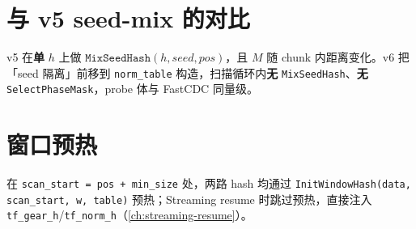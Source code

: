 \section{与 v5 seed-mix 的对比}

v5 在\textbf{单} $h$ 上做 $\texttt{MixSeedHash}(h, seed, pos)$，且 $M$ 随 chunk 内距离变化。v6 把「seed 隔离」前移到 \texttt{norm\_table} 构造，扫描循环内\textbf{无} \texttt{MixSeedHash}、\textbf{无} \texttt{SelectPhaseMask}，probe 体与 FastCDC 同量级。

\section{窗口预热}

在 \texttt{scan\_start = pos + min\_size} 处，两路 hash 均通过 \texttt{InitWindowHash(data, scan\_start, w, table)} 预热；Streaming resume 时跳过预热，直接注入 \texttt{tf\_gear\_h}/\texttt{tf\_norm\_h}（\cref{ch:streaming-resume}）。
